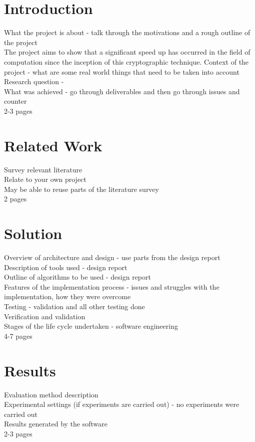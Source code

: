 \documentclass[12pt,a4paper]{article}
\begin{document}
\section{Introduction}

What the project is about - talk through the motivations and a rough outline of the project\\
The project aims to show that a significant speed up has occurred in the field of computation since the inception of this cryptographic technique.
Context of the project - what are some real world things that need to be taken into account\\
Research question - \\
What was achieved - go through deliverables and then go through issues and counter\\
2-3 pages

\section{Related Work}

Survey relevant literature\\
Relate to your own project\\
May be able to reuse parts of the literature survey\\
2 pages

\section{Solution}

Overview of architecture and design - use parts from the design report\\
Description of tools used - design report\\
Outline of algorithms to be used - design report\\
Features of the implementation process - issues and struggles with the implementation, how they were overcome\\
Testing - validation and all other testing done\\
Verification and validation\\
Stages of the life cycle undertaken - software engineering\\
4-7 pages

\section{Results}

Evaluation method description\\
Experimental settings (if experiments are carried out) - no experiments were carried out\\
Results generated by the software\\
2-3 pages
\end{document}
